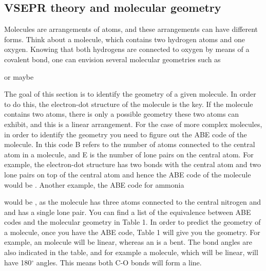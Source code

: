 \documentclass[main.tex]{subfiles}
\begin{document}
\subsection*{VSEPR theory and molecular geometry}
Molecules are arrangements of atoms, and these arrangements can have different forms. Think about a  molecule, which contains two hydrogen atoms and one oxygen. Knowing that both hydrogens are connected to oxygen by means of a covalent bond, one can envision several molecular geometries such as 
\begin{center}
\hspace{.05in} or \hspace{1cm} maybe \hspace{1cm} 
\end{center} 
The goal of this section is to identify the geometry of a given molecule. In order to do this, the electron-dot structure of the molecule is the key. If the molecule contains two atoms, there is only a possible geometry these two atoms can exhibit, and this is a linear arrangement. For the case of more complex molecules, in order to identify the geometry you need to figure out the ABE code of the molecule. In this code B refers to the number of atoms connected to the central atom in a molecule, and E is the number of lone pairs on the central atom. For example, the electron-dot \hspace{.05in}\hspace{.05in} structure has two bonds with the central atom  and two lone pairs on top of the central atom  and hence the ABE code of the molecule would be . Another example, the ABE code for  ammonia  \begin{center}  \end{center}  
would be , as the molecule has three atoms connected to the central nitrogen and and  has a single lone pair. You can find a list of the equivalence between ABE codes and the molecular geometry in Table 1. In order to predict the geometry of a molecule, once you have the ABE code, Table 1 will give you the geometry. For example, an  molecule will be linear, whereas an  is a bent. The bond angles are also indicated in the table, and for example a  molecule, which will be linear, will have 180$^{\circ}$ angles. This means both C-O bonds will form a line.
\end{document}
